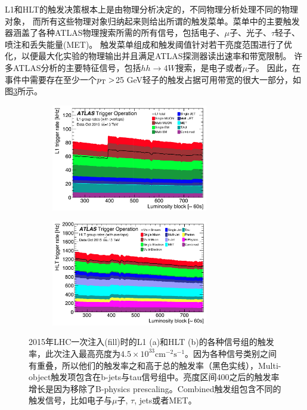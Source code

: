 L1和HLT的触发决策根本上是由物理分析决定的，不同物理分析处理不同的物理对象，
而所有这些物理对象归纳起来则给出所谓的触发菜单。菜单中的主要触发器涵盖了各种ATLAS物理搜索所需的所有信号，包括电子、$\mu$子、光子、$\tau$轻子、喷注和丢失能量(MET)。
触发菜单组成和触发阈值针对若干亮度范围进行了优化，以便最大化实验的物理输出并且满足ATLAS探测器读出速率和带宽限制。
许多ATLAS分析的主要特征信号，包括$hh\rightarrow 4W$搜索，是电子或者$\mu$子。 因此，在事件中需要存在至少一个$p_{\text{T}}>$25 GeV轻子的触发占据可用带宽的很大一部分，如图\ref{fig:Trigger_singlelepton}所示。
\begin{figure}[h]
\begin{center}
\begin{subfigure}[b]{\textwidth}
\centering
   \includegraphics[width=0.75\textwidth]{fig/content_menu_figures_Time_L1GroupRate_Stack.png}
   \caption{}
  \label{fig:L1_menu_rates}
  \end{subfigure}
 \begin{subfigure}[b]{\textwidth}
 \centering
  \includegraphics[width=0.75\textwidth]{fig/content_menu_figures_Time_HLTGroupRate_Stack.png}
   \caption{}
   \label{fig:HLT_menu_rates}
  \end{subfigure}
\caption{2015年LHC一次注入(fill)时的L1 (a)和HLT (b)的各种信号组的触发率，此次注入最高亮度为$4.5\times10^{33}\text{cm}^{-2}\text{s}^{-1}$。因为各种信号类别之间有重叠，所以他们的触发率之和高于总的触发率（黑色实线），Multi-object触发项包含在b-jets与tau信号组中。亮度区间400之后的触发率增长是因为移除了B-physics prescaling。Combined触发组包含不同的触发信号，比如电子与$\mu$子, $\tau$, jets或者MET。\cite{Aaboud2017}} \label{fig:Trigger_singlelepton}
\end{center}
\end{figure}
